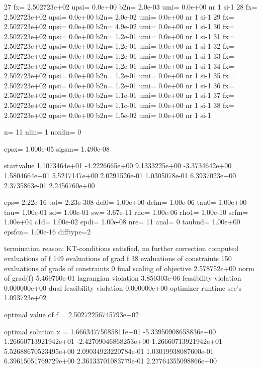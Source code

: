 \documentclass[article]{jss}
\begin{document}
\begin{Schunk}
\begin{Soutput}
   27 fx=   2.502723e+02 upsi=  0.0e+00 b2n=  2.0e-03 umi=  0.0e+00 nr   1 si-1
   28 fx=   2.502723e+02 upsi=  0.0e+00 b2n=  2.0e-02 umi=  0.0e+00 nr   1 si-1
   29 fx=   2.502723e+02 upsi=  0.0e+00 b2n=  4.9e-02 umi=  0.0e+00 nr   1 si-1
   30 fx=   2.502723e+02 upsi=  0.0e+00 b2n=  1.2e-01 umi=  0.0e+00 nr   1 si-1
   31 fx=   2.502723e+02 upsi=  0.0e+00 b2n=  1.2e-01 umi=  0.0e+00 nr   1 si-1
   32 fx=   2.502723e+02 upsi=  0.0e+00 b2n=  1.2e-01 umi=  0.0e+00 nr   1 si-1
   33 fx=   2.502723e+02 upsi=  0.0e+00 b2n=  1.2e-01 umi=  0.0e+00 nr   1 si-1
   34 fx=   2.502723e+02 upsi=  0.0e+00 b2n=  1.2e-01 umi=  0.0e+00 nr   1 si-1
   35 fx=   2.502723e+02 upsi=  0.0e+00 b2n=  1.2e-01 umi=  0.0e+00 nr   1 si-1
   36 fx=   2.502723e+02 upsi=  0.0e+00 b2n=  1.1e-01 umi=  0.0e+00 nr   1 si-1
   37 fx=   2.502723e+02 upsi=  0.0e+00 b2n=  1.1e-01 umi=  0.0e+00 nr   1 si-1
   38 fx=   2.502723e+02 upsi=  0.0e+00 b2n=  1.5e-02 umi=  0.0e+00 nr   1 si-1


     n=        11    nlin=         1    nonlin=         0

  epsx= 1.000e-05 sigsm= 1.490e-08

startvalue
  1.1073464e+01  -4.2226665e+00   9.1333225e+00  -3.3734642e+00   1.5804664e+01 
  5.5217147e+00   2.0291526e-01   1.0305078e-01   6.3937023e+00   2.3735863e-01 
  2.2456760e+00 

  eps=  2.22e-16  tol= 2.23e-308 del0=  1.00e+00 delm=  1.00e-06 tau0=  1.00e+00
  tau=  1.00e-01   sd=  1.00e-01   sw=  3.67e-11  rho=  1.00e-06 rho1=  1.00e-10
 scfm=  1.00e+04  c1d=  1.00e-02 epdi=  1.00e-08
  nre=        11 anal=         0
taubnd=  1.00e+00 epsfcn=  1.00e-16 difftype=2

 termination reason:
 KT-conditions satisfied, no further correction computed
 evaluations of f                          149
 evaluations of grad f                      38
 evaluations of constraints                150
 evaluations of grads of constraints         0
 final scaling of objective           2.578752e+00
 norm of grad(f)                      5.469760e-01
 lagrangian violation                 3.850303e-06
 feasibility violation                0.000000e+00
 dual feasibility violation           0.000000e+00
 optimizer runtime sec's              1.093723e+02


 optimal value of f =   2.50272256745793e+02

 optimal solution  x =
  1.66634775085811e+01 -5.33950908658836e+00  1.26660713921942e+01
 -2.42709046868253e+00  1.26660713921942e+01  5.52688670523495e+00
  2.09034923220784e-01  1.03019938087600e-01  6.39615051769729e+00
  2.36133701083779e-01  2.27764355098866e+00


\end{Soutput}
\end{Schunk}
\end{document}

